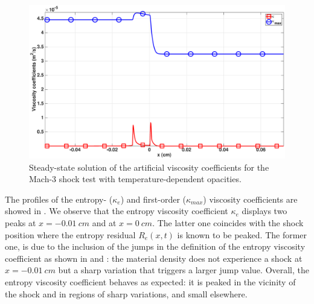 \documentclass[times,doublespace]{fldauth}%
\begin{document}
%
\begin{figure}[H]
    \centering
    \includegraphics[width=\textwidth]{figures/dpt-xs/mach_3_nel_1000_viscosity.eps}
    \caption{Steady-state solution of the artificial viscosity coefficients for the Mach-3 shock test with temperature-dependent opacities.}\label{fig:mach-3-dpt-xs-visc}
\end{figure}
%
The profiles of the entropy- ($\kappa_e$) and first-order ($\kappa_{max}$) viscosity coefficients are showed in . We observe that the entropy viscosity coefficient $\kappa_e$ displays two peaks at $x=-0.01 \ cm$ and at $x = 0 \ cm$. The latter one coincides with the shock position where the entropy residual $R_e(x,t)$ is known to be peaked. %
The former one, is due to the inclusion of the jumps in the definition of the entropy viscosity coefficient as shown in  and : the material density does not experience a shock at $x=-0.01 \ cm$ but a sharp variation that triggers a larger  jump value. 
Overall, the entropy viscosity coefficient behaves as expected: it is peaked in the vicinity of the shock and in regions of sharp variations, and small elsewhere.
%
\end{document}
